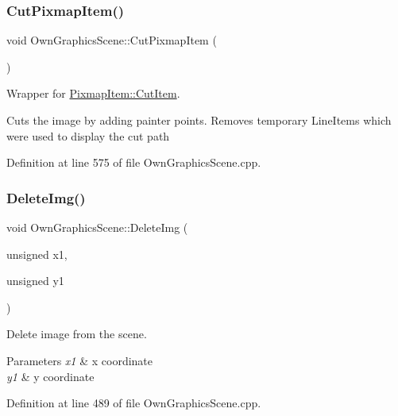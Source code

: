 \mbox{\label{classOwnGraphicsScene_a7e3d97c27cca1df796b75cc4a99e24cd}} 
\subsubsection{\texorpdfstring{Cut\+Pixmap\+Item()}{CutPixmapItem()}}
{\footnotesize\ttfamily void Own\+Graphics\+Scene\+::\+Cut\+Pixmap\+Item (\begin{DoxyParamCaption}{ }\end{DoxyParamCaption})}



Wrapper for \mbox{\hyperlink{classPixmapItem_a4a742318dce01d018da2f4b01790c210}{Pixmap\+Item\+::\+Cut\+Item}}. 

Cuts the image by adding painter points. Removes temporary Line\+Items which were used to display the cut path 

Definition at line 575 of file Own\+Graphics\+Scene.\+cpp.

\mbox{\label{classOwnGraphicsScene_abda962c04f88920377d3bb23b30b9267}} 
\subsubsection{\texorpdfstring{Delete\+Img()}{DeleteImg()}}
{\footnotesize\ttfamily void Own\+Graphics\+Scene\+::\+Delete\+Img (\begin{DoxyParamCaption}\item[{unsigned}]{x1,  }\item[{unsigned}]{y1 }\end{DoxyParamCaption})}



Delete image from the scene. 


\begin{DoxyParams}{Parameters}
{\em x1} & x coordinate \\
\hline
{\em y1} & y coordinate \\
\hline
\end{DoxyParams}


Definition at line 489 of file Own\+Graphics\+Scene.\+cpp.

